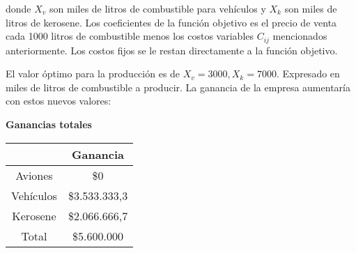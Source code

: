 \documentclass[10pt,a4paper]{article}
\begin{document}
donde $X_v$ son miles de litros de combustible para vehículos y  $X_k$ son miles de litros de kerosene. Los coeficientes de la función objetivo es el precio de venta cada 1000 litros de combustible menos los costos variables $C_{ij}$ mencionados anteriormente. Los costos fijos se le restan directamente a la función objetivo.

El valor óptimo para la producción es de $X_v = 3000, X_k = 7000$. Expresado en miles de litros de combustible a producir. La ganancia de la empresa aumentaría con estos nuevos valores:
\begin{center}
	\textbf{Ganancias totales}
	
	\begin{tabular}{| c | c |}
		\hline
		&           Ganancia    \\
		\hline
		Aviones   & \$0  \\
		\hline
		Vehículos & \$3.533.333,3 \\
		\hline
		Kerosene  & \$2.066.666,7 \\
		\hline
		Total     & \$5.600.000\\
		\hline
	\end{tabular}
\end{center}
\end{document}
